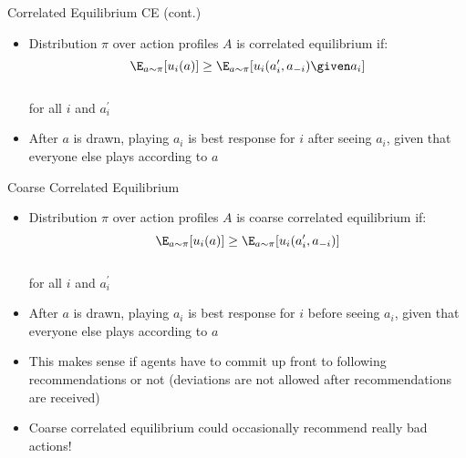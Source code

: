 \documentclass[11pt,aspectratio=169,handout]{beamer}
\begin{document}
  
  \begin{frame}{Correlated Equilibrium  CE (cont.)}
   \begin{itemize}[<+->]
   \setlength{\itemsep}{1.5em}
    \item Distribution $\pi$ over action profiles $A$ is correlated equilibrium if:
    $$\E_{a \sim \pi}[u_i(a)] \geq \E_{a \sim \pi}[u_i(a_i^\prime, a_{-i}) \given a_i]$$\\
    for all $i$ and $a_i^\prime$
    \item After $a$ is drawn, playing $a_i$ is best response for $i$ \alert{after} seeing $a_i$, given that everyone else plays according to $a$
   \end{itemize}
  \end{frame}
  
  
  \begin{frame}{Coarse Correlated Equilibrium}
   \begin{itemize}[<+->]
   \setlength{\itemsep}{1em}
    \item Distribution $\pi$ over action profiles $A$ is coarse correlated equilibrium if:
    $$\E_{a \sim \pi}[u_i(a)] \geq \E_{a \sim \pi}[u_i(a_i^\prime, a_{-i})]$$\\
    for all $i$ and $a_i^\prime$
    \item After $a$ is drawn, playing $a_i$ is best response for $i$ \alert{before} seeing $a_i$, given that everyone else plays according to $a$
    \item This makes sense if agents have to commit \alert{up front} to following recommendations or not (deviations are not allowed after recommendations are received)
    \item Coarse correlated equilibrium could occasionally recommend really bad actions!
   \end{itemize}
  \end{frame}
  
\end{document}
